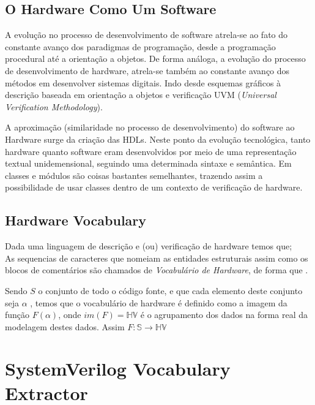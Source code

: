 \documentclass[12pt, twocolumn, a4paper]{article}
\begin{document}

	\subsection{O Hardware Como Um Software}
\quad A evolução no processo de desenvolvimento de software atrela-se ao fato do constante avanço dos paradigmas de programação, desde a programação procedural até a orientação a objetos. De forma análoga, a evolução do processo de desenvolvimento de hardware, atrela-se também ao constante avanço dos métodos em desenvolver sistemas digitais. Indo desde esquemas gráficos à descrição baseada em orientação a objetos e verificação UVM (\textit{Universal Verification Methodology}).

A aproximação (similaridade no processo de desenvolvimento) do software ao Hardware surge da criação das HDLs. Neste ponto da evolução tecnológica, tanto hardware quanto software eram desenvolvidos por meio de uma representação textual unidemensional, seguindo uma determinada sintaxe e semântica. Em \cite{Hahanov2008} classes e módulos são coisas bastantes semelhantes, trazendo assim a possibilidade de usar classes dentro de um contexto de verificação de hardware. 

	\subsection{Hardware Vocabulary} 
	
Dada uma linguagem de descrição e (ou) verificação de hardware temos que;\\
As sequencias de caracteres que nomeiam as entidades estruturais assim como os blocos de comentários são chamados de \textit{Vocabulário de Hardware}, de forma que .  

Sendo $S$ o conjunto de todo o código fonte, e que cada elemento deste conjunto seja $\alpha$ , temos que o vocabulário de hardware é definido como  a imagem da função $F(\alpha)$, onde $im(F) = \mathbb{HV}$ é o agrupamento dos dados na forma real da modelagem destes dados. Assim $F: \mathbb{S}\rightarrow\mathbb{HV}$
	\section{SystemVerilog Vocabulary Extractor}
	
\end{document}
